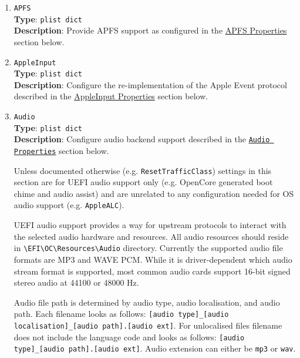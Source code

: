 \documentclass[]{article}
\begin{document}
\begin{enumerate}

\item
  \texttt{APFS}\\
  \textbf{Type}: \texttt{plist\ dict}\\
  \textbf{Description}: Provide APFS support as configured in the
  \hyperref[uefiapfsprops]{APFS Properties} section below.

\item
  \texttt{AppleInput}\\
  \textbf{Type}: \texttt{plist\ dict}\\
  \textbf{Description}: Configure the re-implementation of the Apple Event protocol
  described in the \hyperref[uefiappleinputprops]{AppleInput Properties} section below.

\item
  \texttt{Audio}\\
  \textbf{Type}: \texttt{plist\ dict}\\
  \textbf{Description}: Configure audio backend support described
  in the \hyperref[uefiaudioprops]{\texttt{Audio Properties}} section below.

  Unless documented otherwise (e.g. \texttt{ResetTrafficClass}) settings in this section
  are for UEFI audio support only (e.g. OpenCore generated boot chime and audio assist) and are
  unrelated to any configuration needed for OS audio support (e.g. \texttt{AppleALC}).

  UEFI audio support provides a way for upstream protocols to interact with the
  selected audio hardware and resources. All audio resources should reside
  in \texttt{\textbackslash EFI\textbackslash OC\textbackslash Resources\textbackslash Audio}
  directory. Currently the supported audio file formats are MP3 and WAVE PCM. While it is
  driver-dependent which audio stream format is supported, most common audio cards
  support 16-bit signed stereo audio at 44100 or 48000 Hz.

  Audio file path is determined by audio type, audio localisation, and audio path. Each filename
  looks as follows: \texttt{[audio type]\_[audio localisation]\_[audio path].[audio ext]}.
  For unlocalised files filename does not include the language code and looks as follows:
  \texttt{[audio type]\_[audio path].[audio ext]}. Audio extension can either be \texttt{mp3}
  or \texttt{wav}.


\end{enumerate}
\end{document}
